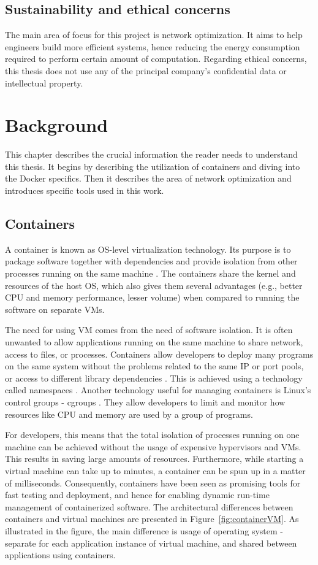 \documentclass[english]{kththesis}
\begin{document}
\section{Sustainability and ethical concerns}
The main area of focus for this project is network optimization. It aims to help engineers build more efficient systems, hence reducing the energy consumption required to perform certain amount of computation. Regarding ethical concerns, this thesis does not use any of the principal company's confidential data or intellectual property.

\cleardoublepage
\chapter{Background}
\label{ch:background}
This chapter describes the crucial information the reader needs to understand this thesis. It begins by describing the utilization of containers and diving into the Docker specifics. Then it describes the area of network optimization and introduces specific tools used in this work.

\section{Containers}
A container is known as OS-level virtualization technology. Its purpose is to package software together with dependencies and provide isolation from other processes running on the same machine \cite{what_is_container}. The containers share the kernel and resources of the host OS, which also gives them several advantages (e.g., better CPU and memory performance, lesser volume) when compared to running the software on separate \glspl{VM}.

The need for using \gls{VM} comes from the need of software isolation. It is often unwanted to allow applications running on the same machine to share network, access to files, or processes. Containers allow developers to deploy many programs on the same system without the problems related to the same IP or port pools, or access to different library dependencies \cite{container_usage}. This is achieved using a technology called namespaces \cite{namespaces}. Another technology useful for managing containers is Linux's control groups - cgroups \cite{cgroups}. They allow developers to limit and monitor how resources like CPU and memory are used by a group of programs.

For developers, this means that the total isolation of processes running on one machine can be achieved without the usage of expensive hypervisors and \glspl{VM}. This results in saving large amounts of resources. Furthermore, while starting a virtual machine can take up to minutes, a container can be spun up in a matter of milliseconds. Consequently, containers have been seen as promising tools for fast testing and deployment, and hence for enabling dynamic run-time management of containerized software. The architectural differences between containers and virtual machines are presented in Figure~\ref{fig:containerVM}. As illustrated in the figure, the main difference is usage of operating system - separate for each application instance of virtual machine, and shared between applications using containers.
\end{document}
